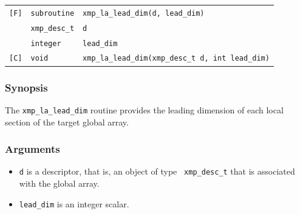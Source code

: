 \begin{tabular}{lll}

\verb![F]!&  {\tt subroutine}& {\tt xmp\_la\_lead\_dim(d, lead\_dim)}\\
          & {\tt xmp\_desc\_t} & {\tt d}\\
          & {\tt integer} & {\tt lead\_dim}\\

\verb![C]!&  {\tt void}& {\tt xmp\_la\_lead\_dim(xmp\_desc\_t d, int lead\_dim)}\\

\end{tabular}

\subsubsection*{Synopsis}

The {\tt xmp\_la\_lead\_dim} routine provides the leading dimension of
each local section of the target global array.

\subsubsection*{Arguments}

\begin{itemize}
 \item {\tt d} is a descriptor, that is, an object of type {\tt
       xmp\_desc\_t} that is associated with the global array.
 \item {\tt lead\_dim} is an integer scalar.
\end{itemize}


